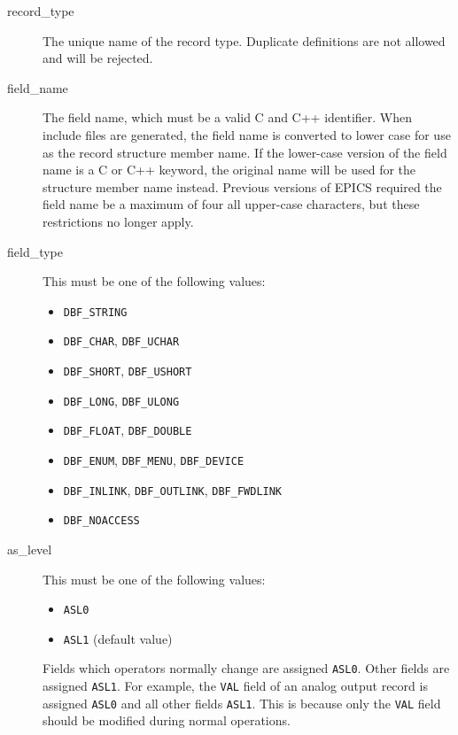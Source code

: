 \begin{description}
\item [record\_type] The unique name of the record type.
Duplicate definitions are not allowed and will be rejected.

\item [field\_name] The field name, which must be a valid C and C++ identifier.
When include files are generated, the field name is converted to lower case for use as the record structure member name.
If the lower-case version of the field name is a C or C++ keyword, the original name will be used for the structure member name instead.
Previous versions of EPICS required the field name be a maximum of four all upper-case characters, but these restrictions no longer apply.

\item [field\_type] This must be one of the following values:

\begin{itemize}
\item \verb|DBF_STRING|
\item \verb|DBF_CHAR|, \verb|DBF_UCHAR|
\item \verb|DBF_SHORT|, \verb|DBF_USHORT|
\item \verb|DBF_LONG|, \verb|DBF_ULONG|
\item \verb|DBF_FLOAT|, \verb|DBF_DOUBLE|
\item \verb|DBF_ENUM|, \verb|DBF_MENU|, \verb|DBF_DEVICE|
\item \verb|DBF_INLINK|, \verb|DBF_OUTLINK|, \verb|DBF_FWDLINK|
\item \verb|DBF_NOACCESS|
\end{itemize}

\item [as\_level] This must be one of the following values:

\begin{itemize}
\item \verb|ASL0|
\item \verb|ASL1|  (default value)
\end{itemize}

Fields which operators normally change are assigned \verb|ASL0|.
Other fields are assigned \verb|ASL1|.
For example, the \verb|VAL| field of an analog output record is assigned \verb|ASL0| and all other fields \verb|ASL1|.
This is because only the \verb|VAL| field should be modified during normal operations.


\end{description}
